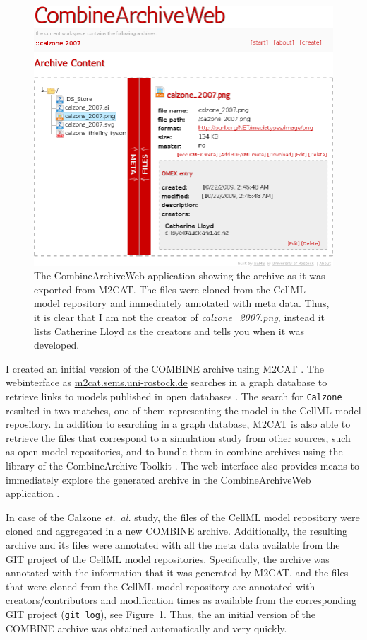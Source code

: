 \begin{figure}
\begin{center}
\includegraphics[width=.8\textwidth]{img/webcat-screenshot-combined.png}
\end{center}
\caption{The CombineArchiveWeb application showing the archive as it was exported from M2CAT. The files were cloned from the CellML model repository and immediately annotated with meta data. Thus, it is clear that I am not the creator of \textit{calzone\_2007.png}, instead it lists Catherine Lloyd as the creators and tells you when it was developed.}
\label{fig:screen:webcat}
\end{figure}

I created an initial version of the COMBINE archive using M2CAT \cite{m2cat}.
The webinterface as \href{http://m2cat.sems.uni-rostock.de/}{m2cat.sems.uni-rostock.de} searches in a graph database to retrieve links to models published in open databases \cite{masymos}.
The search for \texttt{Calzone} resulted in two matches, one of them representing the model in the CellML model repository.
In addition to searching in a graph database, M2CAT is also able to retrieve the files that correspond to a simulation study from other sources, such as open model repositories, and to bundle them in combine archives using the library of the CombineArchive Toolkit \cite{cat}.
The web interface also provides means to immediately explore the generated archive in the CombineArchiveWeb application \cite{scharm2014}.

In case of the Calzone \emph{et.~al.} study, the files of the CellML model repository were cloned and aggregated in a new COMBINE archive.
Additionally, the resulting archive and its files were annotated with all the meta data available from the GIT project of the CellML model repositories.
Specifically, the archive was annotated with the information that it was generated by M2CAT, and the files that were cloned from the CellML model repository are annotated with creators/contributors and modification times as available from the corresponding GIT project (\texttt{git log}), see Figure~\ref{fig:screen:webcat}. Thus, the an initial version of the COMBINE archive was obtained automatically and very quickly.






